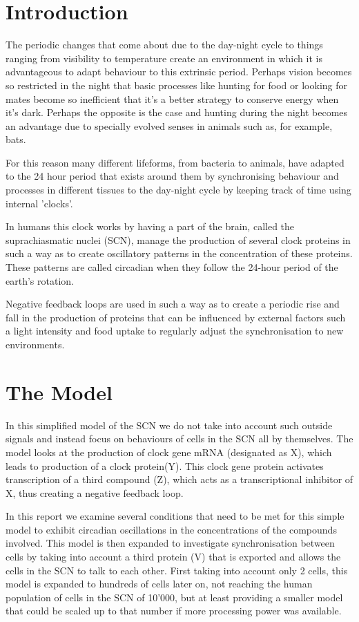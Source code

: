 \section{Introduction}
    The periodic changes that come about due to the day-night cycle to things ranging from visibility to temperature create an environment in which it is advantageous to adapt behaviour to this extrinsic period. Perhaps vision becomes so restricted in the night that basic processes like hunting for food or looking for mates become so inefficient that it's a better strategy to conserve energy when it's dark. Perhaps the opposite is the case and hunting during the night becomes an advantage due to specially evolved senses in animals such as, for example, bats.
    
    For this reason many different lifeforms, from bacteria to animals, have adapted to the 24 hour period that exists around them by synchronising behaviour and processes in different tissues to the day-night cycle by keeping track of time using internal 'clocks'.
    
    In humans this clock works by having a part of the brain, called the suprachiasmatic nuclei (SCN), manage the production of several clock proteins in such a way as to create oscillatory patterns in the concentration of these proteins. These patterns are called circadian when they follow the 24-hour period of the earth's rotation. 
    
    Negative feedback loops are used in such a way as to create a periodic rise and fall in the production of proteins that can be influenced by external factors such a light intensity and food uptake to regularly adjust the synchronisation to new environments. \\

\section{The Model}
In this simplified model of the SCN we do not take into account such outside signals and instead focus on behaviours of cells in the SCN all by themselves. The model looks at the production of clock gene mRNA (designated as X), which leads to production of a clock protein(Y). This clock gene protein activates transcription of a third compound (Z), which acts as a transcriptional inhibitor of X, thus creating a negative feedback loop.
    
    In this report we examine several conditions that need to be met for this simple model to exhibit circadian oscillations in the concentrations of the compounds involved. This model is then expanded to investigate synchronisation between cells by taking into account a third protein (V) that is exported and allows the cells in the SCN to talk to each other. First taking into account only 2 cells, this model is expanded to hundreds of cells later on, not reaching the human population of cells in the SCN of 10'000, but at least providing a smaller model that could be scaled up to that number if more processing power was available. \\